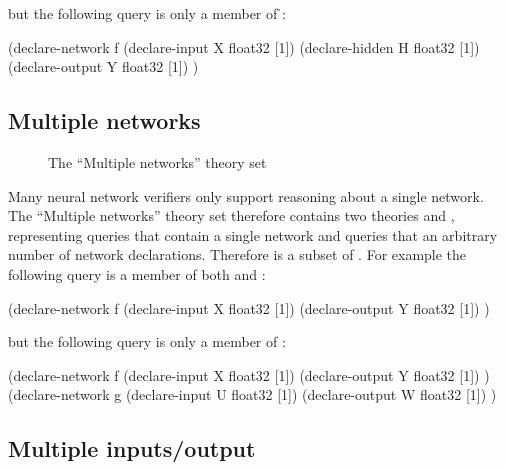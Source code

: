 but the following query is only a member of \h{}:

\begin{code}[style=lbnf]
(declare-network f
    (declare-input  X float32 [1])
    (declare-hidden H float32 [1])
    (declare-output Y float32 [1])
)
\end{code}

\subsection{Multiple networks}
\label{sec:multiple-networks}

\begin{figure}[h]
\centering
{}
\caption{The ``Multiple networks'' theory set}
\label{fig:multiple-networks-theory-set}
\end{figure}

Many neural network verifiers only support reasoning about a single network. The ``Multiple networks'' theory set therefore contains two theories \snet{} and \mnet{}, representing queries that contain a single network and queries that an arbitrary number of network declarations. Therefore \snet{} is a subset of \mnet{}. For example the following query is a member of both \snet{} and \mnet{}:

\begin{code}[style=lbnf]
(declare-network f
    (declare-input  X float32 [1])
    (declare-output Y float32 [1])
)
\end{code}

but the following query is only a member of \mnet{}:

\begin{code}[style=lbnf]
(declare-network f
    (declare-input  X float32 [1])
    (declare-output Y float32 [1])
)
(declare-network g
    (declare-input  U float32 [1])
    (declare-output W float32 [1])
)
\end{code}

\subsection{Multiple inputs/output}
\label{sec:multiple-inputs-outputs}


